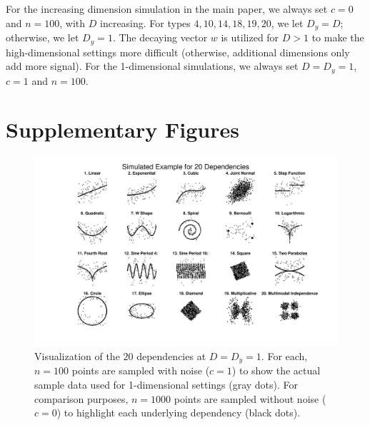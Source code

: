 \documentclass[11pt]{article}
\begin{document}
For the increasing dimension simulation in the main paper, we always set $c=0$ and $n=100$, with $D$ increasing.  For types  $4,10,14,18,19,20$, we let $D_y=D$; otherwise, we let $D_y=1$. 
The decaying vector $w$ is utilized for $D>1$ to make the high-dimensional settings more difficult (otherwise, additional dimensions only add more signal).
For the 1-dimensional simulations, we always set $D=D_y=1$, $c=1$ and $n=100$.

\clearpage

\section{Supplementary Figures}
\label{appen:figs}

\begin{figure}[htbp]
\includegraphics[trim={5cm 1.5cm 4cm 0.5cm},clip, width=1.0\textwidth]{Figures/FigSimVisual}
\caption{Visualization of the $20$ dependencies at $D=D_{y}=1$. For each, $n=100$ points are sampled with noise ($c=1$) to show the actual sample data used for 1-dimensional settings (gray dots). For comparison purposes, $n=1000$ points are sampled without noise ($c=0$) to highlight each underlying dependency (black dots).
}
\label{f:dependencies}
\end{figure}
\end{document}
